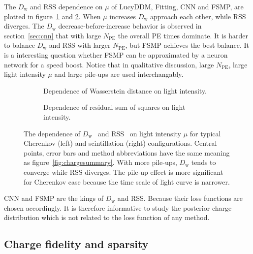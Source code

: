 
The $D_\mathrm{w}$ and RSS dependence on $\mu$ of LucyDDM, Fitting, CNN and FSMP, are plotted in figure~\ref{fig:wdistsummary} and \ref{fig:rsssummary}.  When $\mu$ increases $D_\mathrm{w}$ approach each other, while RSS diverges.  The $D_\mathrm{w}$ decrease-before-increase behavior is observed in section~\ref{sec:cnn} that with large $N_\mathrm{PE}$ the overall PE times dominate.  It is harder to balance $D_\mathrm{w}$ and RSS with larger $N_\mathrm{PE}$, but FSMP achieves the best balance.  It is a interesting question whether FSMP can be approximated by a neuron network for a speed boost.  Notice that in qualitative discussion, large $N_\mathrm{PE}$, large light intensity $\mu$ and large pile-ups are used interchangably.
\begin{figure}[H]
  \begin{subfigure}[b]{\textwidth}
    \resizebox{\textwidth}{!}{}
    \caption{\label{fig:wdistsummary}Dependence of Wasserstein distance on light intensity.}
  \end{subfigure}

  \vspace{0.5em}
  \begin{subfigure}[b]{\textwidth}
    \resizebox{\textwidth}{!}{}
    \caption{\label{fig:rsssummary}Dependence of residual sum of squares on light intensity.}
  \end{subfigure}
  \caption{\label{fig:summary}The dependence of $D_\mathrm{w}$~ and RSS~ on light intensity $\mu$ for typical Cherenkov (left) and scintillation (right) configurations.  Central points, error bars and method abbreviations have the same meaning as figure~\ref{fig:chargesummary}.  With more pile-ups, $D_\mathrm{w}$ tends to converge while RSS diverges.  The pile-up effect is more significant for Cherenkov case because the time scale of light curve is narrower. }
\end{figure}

CNN and FSMP are the kings of $D_\mathrm{w}$ and RSS.  Because their loss functions are chosen accordingly.  It is therefore informative to study the posterior charge distribution which is not related to the loss function of any method.

\subsection{Charge fidelity and sparsity}

